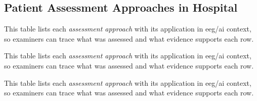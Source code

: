 \iffalse %
\subsection{Patient Assessment Approaches in Hospital}
\label{sec:patient_assessment}


\noindent This table lists each \textit{assessment approach} with its application in eeg/ai context, so examiners can trace what was assessed and what evidence supports each row.



\noindent This table lists each \textit{assessment approach} with its application in eeg/ai context, so examiners can trace what was assessed and what evidence supports each row.


\noindent This table lists each \textit{assessment approach} with its application in eeg/ai context, so examiners can trace what was assessed and what evidence supports each row.



